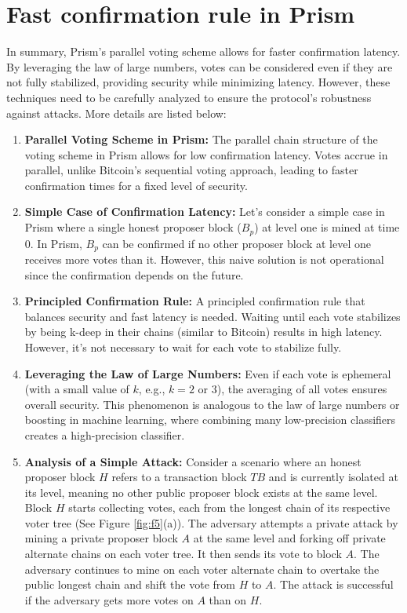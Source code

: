 \section{Fast confirmation rule in Prism}
In summary, Prism's parallel voting scheme allows for faster confirmation latency. By leveraging the law of large numbers, votes can be considered even if they are not fully stabilized, providing security while minimizing latency. However, these techniques need to be carefully analyzed to ensure the protocol's robustness against attacks. More details are listed below:
\begin{enumerate}
    \item \textbf{Parallel Voting Scheme in Prism:} The parallel chain structure of the voting scheme in Prism allows for low confirmation latency. Votes accrue in parallel, unlike Bitcoin's sequential voting approach, leading to faster confirmation times for a fixed level of security.
    \item \textbf{Simple Case of Confirmation Latency:} Let's consider a simple case in Prism where a single honest proposer block ($B_{p}$) at level one is mined at time $0$. In Prism, $B_{p}$ can be confirmed if no other proposer block at level one receives more votes than it. However, this naive solution is not operational since the confirmation depends on the future.
    \item \textbf{Principled Confirmation Rule:} A principled confirmation rule that balances security and fast latency is needed. Waiting until each vote stabilizes by being k-deep in their chains (similar to Bitcoin) results in high latency. However, it's not necessary to wait for each vote to stabilize fully.
    \item \textbf{Leveraging the Law of Large Numbers:} Even if each vote is ephemeral (with a small value of $k$, e.g., $k = 2$ or $3$), the averaging of all votes ensures overall security. This phenomenon is analogous to the law of large numbers or boosting in machine learning, where combining many low-precision classifiers creates a high-precision classifier.
    \item \textbf{Analysis of a Simple Attack:} Consider a scenario where an honest proposer block $H$ refers to a transaction block $TB$ and is currently isolated at its level, meaning no other public proposer block exists at the same level. Block $H$ starts collecting votes, each from the longest chain of its respective voter tree (See Figure \ref{fig:f5}(a)). The adversary attempts a private attack by mining a private proposer block $A$ at the same level and forking off private alternate chains on each voter tree. It then sends its vote to block $A$. The adversary continues to mine on each voter alternate chain to overtake the public longest chain and shift the vote from $H$ to $A$. The attack is successful if the adversary gets more votes on $A$ than on $H$.
\end{enumerate}
